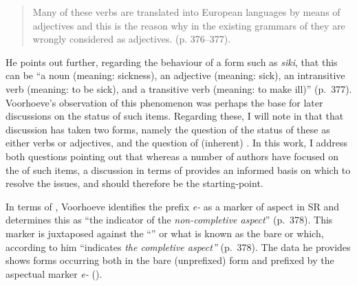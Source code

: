 \begin{quote}
Many of these verbs are translated into European languages by means of
adjectives and this is the reason why in the existing grammars of
 they are wrongly considered as adjectives. (p. 376--377).
\end{quote}

He points out further, regarding the behaviour of a form such as
\textit{siki}, that this can be ``a noun (meaning: sickness), an
adjective (meaning: sick), an intransitive verb (meaning: to be sick),
and a transitive verb (meaning: to make ill)” (p.~377).  Voorhoeve’s
observation of this phenomenon was perhaps the base for later
discussions on the status of such items.  Regarding these, I will note
in  that that discussion has taken two forms, namely the
question of the status of these as either verbs or adjectives, and the
question of (inherent) .  In this work, I address both
questions pointing out that whereas a number of authors have focused
on the  of such items, a discussion in terms of
 provides an informed basis on which to resolve the
issues, and should therefore be the starting-point.

In terms of , Voorhoeve identifies the prefix
\textit{e-} as a marker of aspect in SR and determines this as ``the
indicator of the \textit{non-completive aspect}” (p.~378).  This
marker is juxtaposed against the ``” or what is known as
the bare or  which, according to him ``indicates
\textit{the completive aspect”} (p.~378).  The data he provides shows
forms occurring both in the bare (unprefixed) form and prefixed by the
aspectual marker \textit{e-} ().


